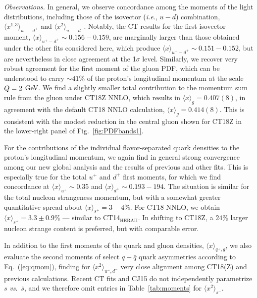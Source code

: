 %
%
%

{\it Observations.} In general, we observe concordance among the moments of the light distributions, including those of the isovector
({\it i.e.}, $u\!-\!d$) combination, $\langle x^{1,3} \rangle_{u^+-d^+}$ and $\langle x^2 \rangle_{u^--d^-}$. Notably, the CT results for the first isovector
moment, $\langle x \rangle_{u^+-d^+}\! \sim\! 0.156\!-\!0.159$, are marginally larger than those obtained under the other fits considered
here, which produce $\langle x \rangle_{u^+-d^+}\! \sim\! 0.151\!-\!0.152$, but are nevertheless in close agreement at the 1$\sigma$ level.
%
%
Similarly, we recover very robust agreement for the first moment of the gluon PDF, which can be understood to carry $\sim\! 41\%$
of the proton's longitudinal momentum at the scale $Q = 2$ GeV. We find a slightly smaller total contribution
to the momentum sum rule from the gluon under CT18Z NNLO, which results in $\langle x \rangle_{g} = 0.407(8)$, in agreement with the default
CT18 NNLO calculation, $\langle x \rangle_{g} = 0.414(8)$. This is consistent with the modest reduction in the central
gluon shown for CT18Z in the lower-right panel of Fig.~\ref{fig:PDFbands1}.

For the contributions of the individual flavor-separated quark densities to the proton's longitudinal momentum, we again find
in general strong convergence among our new global analysis and the results of previous and other fits. This is especially
true for the total $u^+$ and $d^+$ first moments, for which we find concordance at $\langle x \rangle_{u^+}\! \sim\! 0.35$
and $\langle x \rangle_{d^+}\! \sim\! 0.193\!-\!194$. The situation is similar for the total nucleon strangeness momentum,
but with a somewhat greater quantitative spread about $\langle x \rangle_{s^+}\! =\! 3-4\%$. For CT18 NNLO,
we obtain $\langle x \rangle_{s^+} = 3.3 \pm 0.9\%$ --- similar to CT14$_\mathrm{HERAII}$.
In shifting to CT18Z, a $24\%$ larger nucleon strange content is preferred, but with comparable error.


In addition to the first moments of the quark and gluon densities, $\langle x \rangle_{q^+,g}$, we also evaluate
the second moments of select $q-\bar{q}$ quark asymmetries according to Eq.~(\ref{eq:qmom}), finding for $\langle x^2 \rangle_{u^-,d^-}$
very close alignment among CT18(Z) and previous calculations. Recent CT fits and CJ15 do not independently parametrize $s$ {\it vs}.~$\overline{s}$,
and we therefore omit entries in Table~\ref{tab:moments} for $\langle x^2 \rangle_{s^-}$.



